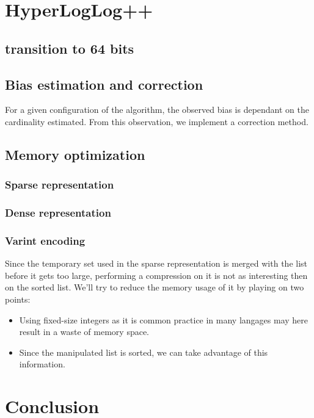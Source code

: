\documentclass{article}
\begin{document}
\section{HyperLogLog++}

\subsection{transition to 64 bits}

\subsection{Bias estimation and correction}
For a given configuration of the algorithm, the observed bias
is dependant on the cardinality estimated. From this observation, we
implement a correction method. 
\subsection{Memory optimization}
\subsubsection{Sparse representation}
\subsubsection{Dense representation}
\subsubsection{Varint encoding}
Since the temporary set used in the sparse representation is merged
with the list before it gets too large, performing a compression on it
is not as interesting then on the sorted list. We'll try to reduce the
memory usage of it by playing on two points:
\begin{itemize}
\item Using fixed-size integers as it is common practice in many
  langages may here result in a waste of memory space.
\item Since the manipulated list is sorted, we can take advantage of
  this information.
\end{itemize}

\section{Conclusion}
\end{document}

